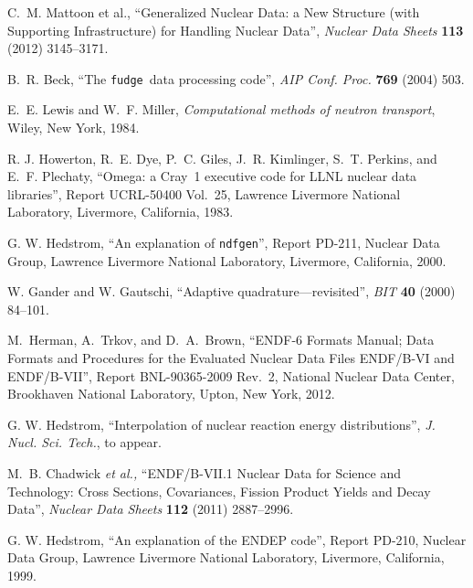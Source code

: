 \documentclass[11pt]{report}
\newcommand{\xndfgen}{\texttt{fudge}}
\newcommand{\ndfgen}{\texttt{ndfgen}}
\begin{document}
\begin{thebibliography}{99}
\frenchspacing

 C.~M. Mattoon et al.,
``Generalized Nuclear Data: a New Structure (with Supporting Infrastructure) 
for Handling Nuclear Data'',
\textit{Nuclear Data Sheets} \textbf{113} (2012) 3145--3171.

 B.~R. Beck,
``The \xndfgen\ data processing code'',
\textit{AIP Conf. Proc.} \textbf{769} (2004) 503.

 E.~E. Lewis and W.~F. Miller,
\textit{Computational methods of neutron transport},
Wiley, New York, 1984.

 R. J. Howerton, R.~E. Dye, P.~C. Giles,
J.~R. Kimlinger, S.~T. Perkins, and E.~F. Plechaty,
``Omega: a Cray~1 executive code for LLNL nuclear data
libraries'',
Report UCRL-50400 Vol.~25, 
Lawrence Livermore National Laboratory, Livermore, California,
1983.

 G. W. Hedstrom, ``An explanation of
\ndfgen'', Report PD-211, Nuclear Data Group,
Lawrence Livermore National Laboratory, Livermore, California,
2000.

 W. Gander and W. Gautschi,
``Adaptive quadrature---revisited'', \textit{BIT} \textbf{40} (2000) 84--101.

 M.~Herman, A.~Trkov, and D.\ A.\ Brown,
``ENDF-6 Formats Manual;
Data Formats and Procedures for the Evaluated Nuclear Data Files ENDF/B-VI and ENDF/B-VII'',
Report BNL-90365-2009 Rev.~2,
National Nuclear Data Center,
Brookhaven National Laboratory,
Upton, New York, 2012.

 G. W. Hedstrom, 
``Interpolation of nuclear reaction energy distributions'', 
\textit{J. Nucl. Sci. Tech.}, to appear.

 M.~B. Chadwick \textit{et al.,}
``ENDF/B-VII.1 Nuclear Data for Science and Technology: Cross Sections, Covariances, Fission Product Yields and Decay Data'',
\textit{Nuclear Data Sheets} \textbf{112} (2011) 2887--2996.


 G. W. Hedstrom, ``An explanation of
the \textsf{ENDEP} code'', Report PD-210, Nuclear Data Group,
Lawrence Livermore National Laboratory, Livermore, California,
1999.


\end{thebibliography}
\end{document}
